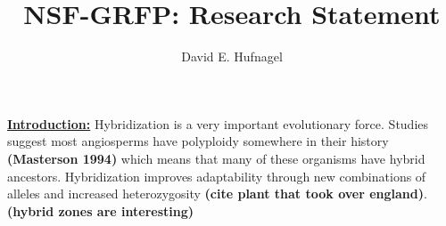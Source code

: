 \documentclass[12pt]{amsart}
\title{NSF-GRFP: Research Statement}
\author{David E. Hufnagel}
\begin{document}
\maketitle

\textbf{\underline{Introduction:} }
Hybridization is a very important evolutionary force.
Studies suggest most angiosperms have polyploidy somewhere in their history \textbf{(Masterson 1994)} which means that many of these organisms have hybrid ancestors.
Hybridization improves adaptability through new combinations of alleles and increased heterozygosity \textbf{(cite plant that took over england)}. \textbf{(hybrid zones are interesting)}
\end{document}
